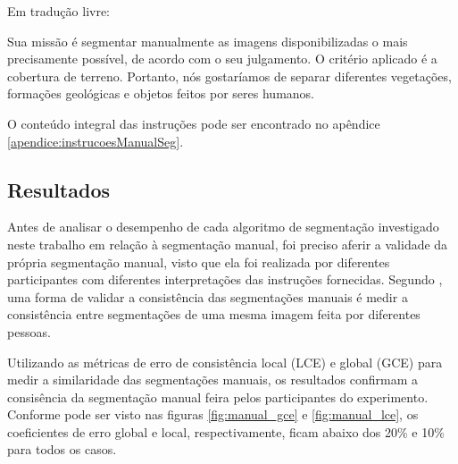Em tradução livre:

\begin{citacao}
Sua missão é segmentar manualmente as imagens disponibilizadas o mais precisamente possível, de acordo com o seu julgamento. O critério aplicado é a cobertura de terreno. Portanto, nós gostaríamos de separar diferentes vegetações, formações geológicas e objetos feitos por seres humanos. \cite{amazonsegmentation}
\end{citacao}

O conteúdo integral das instruções pode ser encontrado no apêndice \ref{apendice:instrucoesManualSeg}.

\subsection{Resultados}

Antes de analisar o desempenho de cada algoritmo de segmentação investigado neste trabalho em relação à segmentação manual, foi preciso aferir a validade da própria segmentação manual, visto que ela foi realizada por diferentes participantes com diferentes interpretações das instruções fornecidas. Segundo , uma forma de validar a consistência das segmentações manuais é medir a consistência entre segmentações de uma mesma imagem feita por diferentes pessoas.

Utilizando as métricas de erro de consistência local (LCE) e global (GCE) para medir a similaridade das segmentações manuais, os resultados confirmam a consisência da segmentação manual feira pelos participantes do experimento. Conforme pode ser visto nas figuras \ref{fig:manual_gce} e \ref{fig:manual_lce}, os coeficientes de erro global e local, respectivamente, ficam abaixo dos 20\% e 10\% para todos os casos.

